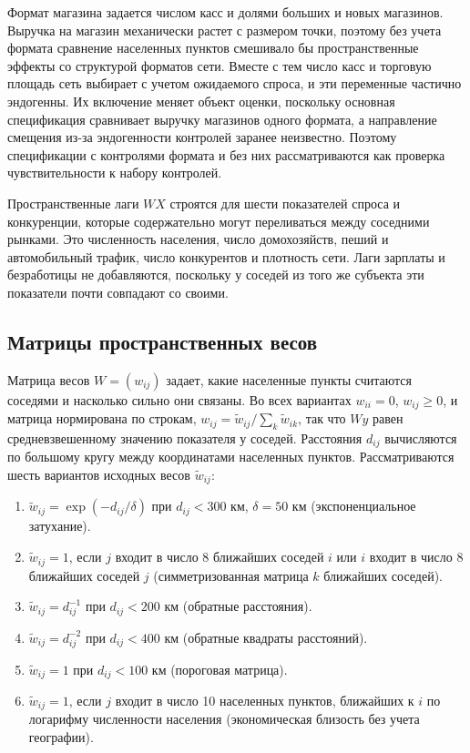 \documentclass[12pt, a4paper]{article}
\begin{document}
Формат магазина задается числом касс и долями больших и новых магазинов. Выручка на магазин
механически растет с размером точки, поэтому без учета формата сравнение населенных пунктов смешивало бы
пространственные эффекты со структурой форматов сети. Вместе с тем число касс и торговую площадь
сеть выбирает с учетом ожидаемого спроса, и эти переменные частично эндогенны. Их включение
меняет объект оценки, поскольку основная спецификация сравнивает выручку магазинов одного
формата, а направление смещения из-за эндогенности контролей заранее неизвестно. Поэтому
спецификации с контролями формата и без них рассматриваются как проверка чувствительности к
набору контролей.

Пространственные лаги $WX$ строятся для шести показателей спроса и конкуренции, которые
содержательно могут переливаться между соседними рынками. Это численность населения, число
домохозяйств, пеший и автомобильный трафик, число конкурентов и плотность сети. Лаги зарплаты и
безработицы не добавляются, поскольку у соседей из того же субъекта эти показатели почти
совпадают со своими.

\subsection*{Матрицы пространственных весов}

Матрица весов $W = (w_{ij})$ задает, какие населенные пункты считаются соседями и насколько сильно
они связаны. Во всех вариантах $w_{ii} = 0$, $w_{ij} \ge 0$, и матрица нормирована по строкам,
$w_{ij} = \tilde{w}_{ij} / \sum_k \tilde{w}_{ik}$, так что $Wy$ равен средневзвешенному значению
показателя у соседей. Расстояния $d_{ij}$ вычисляются по большому кругу между координатами
населенных пунктов. Рассматриваются шесть вариантов исходных весов $\tilde{w}_{ij}$:

\begin{enumerate}
    \item $\tilde{w}_{ij} = \exp(-d_{ij} / \delta)$ при $d_{ij} < 300$ км, $\delta = 50$ км
    (экспоненциальное затухание).
    \item $\tilde{w}_{ij} = 1$, если $j$ входит в число 8 ближайших соседей $i$ или $i$ входит в
    число 8 ближайших соседей $j$ (симметризованная матрица $k$ ближайших соседей).
    \item $\tilde{w}_{ij} = d_{ij}^{-1}$ при $d_{ij} < 200$ км (обратные расстояния).
    \item $\tilde{w}_{ij} = d_{ij}^{-2}$ при $d_{ij} < 400$ км (обратные квадраты расстояний).
    \item $\tilde{w}_{ij} = 1$ при $d_{ij} < 100$ км (пороговая матрица).
    \item $\tilde{w}_{ij} = 1$, если $j$ входит в число 10 населенных пунктов, ближайших к $i$ по логарифму
    численности населения (экономическая близость без учета географии).
\end{enumerate}
\end{document}
